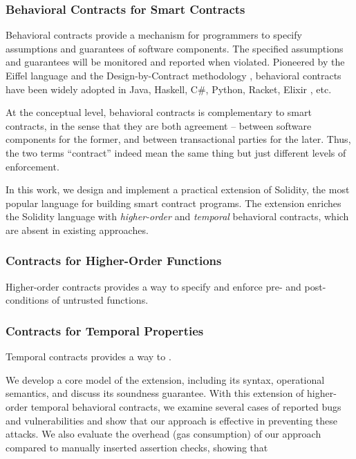 \documentclass[acmsmall,review,anonymous]{acmart}\settopmatter{printfolios=true,printccs=false,printacmref=false}
\begin{document}
\subsubsection*{\textbf{Behavioral Contracts for Smart Contracts}}
Behavioral contracts provide a mechanism for programmers to specify assumptions
and guarantees of software components. The specified assumptions and guarantees
will be monitored and reported when violated.
Pioneered by the Eiffel language \cite{DBLP:books/ph/Meyer91} and the
Design-by-Contract methodology \cite{DBLP:conf/tools/Meyer98a}, behavioral
contracts have been widely adopted in Java, Haskell, C\#, Python, Racket,
Elixir \cite{DBLP:conf/erlang/0001BBHMEF22}, etc. 


At the conceptual level, behavioral contracts is complementary to smart
contracts, in the sense that they are both agreement -- between software
components for the former, and between transactional parties for the later.
Thus, the two terms ``contract'' indeed mean the same thing but just different
levels of enforcement.

In this work, we design and implement a practical extension of Solidity, the
most popular language for building smart contract programs. The extension
enriches the Solidity language with \emph{higher-order} and \emph{temporal}
behavioral contracts, which are absent in existing approaches.

\subsubsection*{\textbf{Contracts for Higher-Order Functions}}
Higher-order contracts provides a way to specify and enforce pre- and
post-conditions of untrusted functions. 


\subsubsection*{\textbf{Contracts for Temporal Properties}}
Temporal contracts provides a way to .


We develop a core model of the extension, including its syntax,
operational semantics, and discuss its soundness guarantee.
With this extension of higher-order temporal behavioral contracts, we examine
several cases of reported bugs and vulnerabilities and show that
our approach is effective in preventing these attacks.
We also evaluate the overhead (gas consumption) of our approach
compared to manually inserted assertion checks, showing that 
\end{document}
